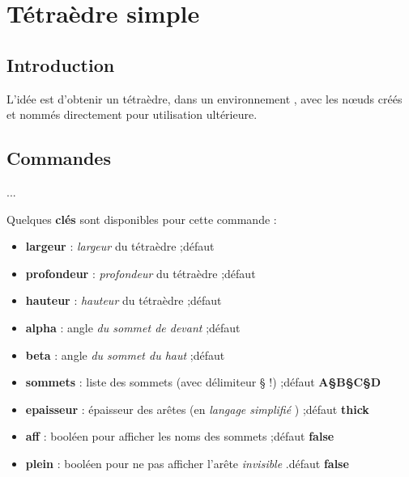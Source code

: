 \documentclass{article}
\newcommand\Cle[1]{{\bfseries\sffamily\textlangle #1\textrangle}}
\begin{document}
\newpage

\section{Tétraèdre \og simple \fg}\label{tetra}

\subsection{Introduction}

\begin{codeidee}
L'idée est d'obtenir un tétraèdre, dans un environnement \TikZ, avec les nœuds créés et nommés directement pour utilisation ultérieure.
\end{codeidee}

\subsection{Commandes}

\begin{codetex}
...
\end{codetex}

\begin{codecles}
Quelques \Cle{clés} sont disponibles pour cette commande :

\begin{itemize}
	\item \Cle{largeur} : \textit{largeur} du tétraèdre ;\hfill{}défaut \Cle{4}
	\item \Cle{profondeur} : \textit{profondeur} du tétraèdre ;\hfill{}défaut \Cle{1.25}
	\item \Cle{hauteur} : \textit{hauteur} du tétraèdre ;\hfill{}défaut \Cle{3}
	\item \Cle{alpha} : angle \textit{du sommet de devant} ;\hfill{}défaut \Cle{40}
	\item \Cle{beta} : angle \textit{du sommet du haut} ;\hfill{}défaut \Cle{60}
	\item \Cle{sommets} : liste des sommets (avec délimiteur § !) ;\hfill{}défaut \Cle{A§B§C§D}
	\item \Cle{epaisseur} : épaisseur des arêtes (en \textit{langage simplifié} \TikZ) ;\hfill{}défaut \Cle{thick}
	\item \Cle{aff} : booléen pour afficher les noms des sommets ;\hfill{}défaut \Cle{false}
	\item \Cle{plein} : booléen pour ne pas afficher l'arête \textit{invisible} .\hfill{}défaut \Cle{false}
\end{itemize}
\end{codecles}
\end{document}
